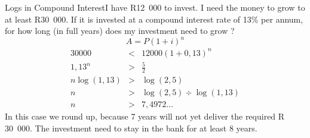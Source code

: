 \begin{wex}{}{}{}{Logs in Compound Interest}{I have R12~000 to invest.  I need the money to grow to at least R30~000.  If it is invested at a compound interest rate of 13\% per annum, for how long (in full years) does my investment need to grow ? }{
\begin{equation*}
A=P(1+i)^n 
\end{equation*}
\begin{eqnarray*}
30000 &<& 12000(1+0,13)^n\\
1,13^n &>& \frac{5}{2}\\
n\log(1,13) &>& \log(2,5)\\
n &>& \log(2,5) \div \log(1,13)\\
n &>& 7,4972\ldots
\end{eqnarray*}
In this case we round up, because 7 years will not yet deliver the required R 30~000.
The investment need to stay in the bank for at least 8 years.}\end{wex}

